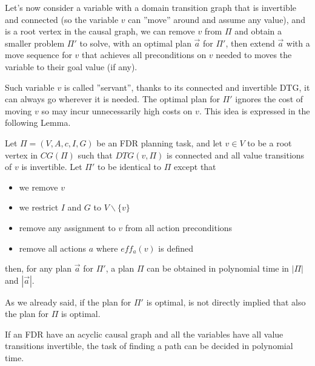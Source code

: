\documentclass[10pt, letterpaper]{report}
\begin{document}
Let's now consider a variable with a domain transition graph that is invertible and connected (so the variable $v$ can ''move'' around and assume any value), and is a root vertex in the causal graph, we can remove $v$ from $\Pi$ and obtain a smaller problem $\Pi'$ to solve, with an optimal plan $\vec a$ for $\Pi'$, then extend $\vec a$ with a move sequence for $v$ that achieves all preconditions on $v$ needed to moves the variable to their goal value (if any).

Such variable $v$ is called ''servant'', thanks to its connected and invertible DTG, it can always go wherever it is needed. The optimal plan for $\Pi'$
 ignores the cost of moving $v$ so may incur unnecessarily high costs on $v$. This idea is expressed in the following Lemma.\begin{lemma2}
     Let $\Pi = (V, A, c, I, G)$ be an FDR planning task, and let $v\in V$ to be a root vertex in $CG(\Pi)$ such that $DTG(v,\Pi)$ is connected and all value transitions of $v$ is invertible. Let $\Pi'$ to be identical to $\Pi$ except that\begin{itemize}
        \item we remove $v$
        \item we restrict $I$ and $G$ to $V\backslash\{v\}$
        \item remove any  assignment to $v$ from all action
 preconditions
        \item remove all actions $a$ where $eff_a(v)$ is defined
     \end{itemize}
     then, for any plan $\vec a$ for $\Pi'$, a plan $\Pi$ can be obtained in polynomial time in $|\Pi|$ and $|\vec a|$.
 \end{lemma2}
 As we already said, if the plan for $\Pi'$ is optimal, is not directly implied that also the plan for $\Pi$ is optimal.
 \begin{theorem}
    If an FDR have an acyclic causal graph and all the variables have all value transitions invertible, the task of finding a path can be decided in polynomial time.
 \end{theorem}
\end{document}

